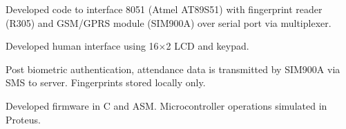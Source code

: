 \documentclass[]{deedy}
\begin{document}
\begin{minipage}[t]{0.69\textwidth}
\begin{flushleft}
%
\vspace{5pt} %
\vspace{1.1pt}
\begin{tightemize}
\item Developed code to interface 8051 (Atmel AT89S51) with fingerprint reader (R305) and GSM/GPRS module (SIM900A) over serial port via multiplexer.
\item Developed human interface using 16$\times$2 LCD and keypad.
\item Post biometric authentication, attendance data is transmitted by SIM900A via SMS to server. Fingerprints stored locally only.
\item Developed firmware in C and ASM. Microcontroller operations simulated in Proteus.
\end{tightemize}
\sectionsep

\end{flushleft}
\end{minipage}
\end{document}
